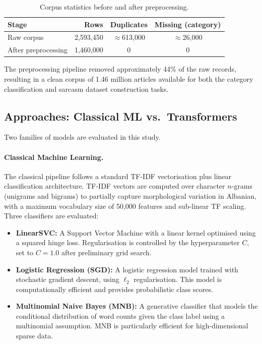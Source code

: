 \documentclass[12pt,a4paper]{article}
\begin{document}
\begin{table}[H]
    \centering
    \caption{Corpus statistics before and after preprocessing.}
    \label{tab:preprocessing}
    \begin{tabular}{lrcc}
        \toprule
        \textbf{Stage} & \textbf{Rows} & \textbf{Duplicates} & \textbf{Missing (category)} \\
        \midrule
        Raw corpus          & 2{,}593{,}450 & $\approx$613{,}000 & $\approx$26{,}000 \\
        After preprocessing & 1{,}460{,}000 & 0                  & 0                 \\
        \bottomrule
    \end{tabular}
\end{table}

The preprocessing pipeline removed approximately 44\% of the raw records, resulting in a clean corpus of 1.46 million articles available for both the category classification and sarcasm dataset construction tasks.

\subsection{Approaches: Classical ML vs.\ Transformers}
\label{subsec:approaches}

Two families of models are evaluated in this study.

\paragraph{Classical Machine Learning.}
The classical pipeline follows a standard TF-IDF vectorisation plus linear classification architecture. TF-IDF vectors are computed over character $n$-grams (unigrams and bigrams) to partially capture morphological variation in Albanian, with a maximum vocabulary size of 50,000 features and sub-linear TF scaling. Three classifiers are evaluated:

\begin{itemize}[itemsep=0.2em]
    \item \textbf{LinearSVC:} A Support Vector Machine with a linear kernel optimised using a squared hinge loss. Regularisation is controlled by the hyperparameter $C$, set to $C=1.0$ after preliminary grid search.
    \item \textbf{Logistic Regression (SGD):} A logistic regression model trained with stochastic gradient descent, using $\ell_2$ regularisation. This model is computationally efficient and provides probabilistic class scores.
    \item \textbf{Multinomial Naive Bayes (MNB):} A generative classifier that models the conditional distribution of word counts given the class label using a multinomial assumption. MNB is particularly efficient for high-dimensional sparse data.
\end{itemize}
\end{document}
